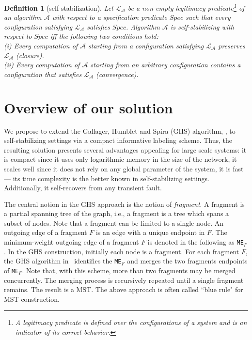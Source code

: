\documentclass[11pt,a4paper]{article}
\newtheorem{definition}{Definition}
\newcommand{\MF}{\mbox{\tt ME}}
\begin{document}
\begin{definition}[self-stabilization]
Let $\mathcal{L_{A}}$ be a non-empty \emph{legitimacy predicate}\footnote{A legitimacy predicate is defined over the configurations of a system and is an indicator of its correct behavior.} of an algorithm $\mathcal{A}$ with respect to a specification predicate $Spec$ such that every configuration satisfying $\mathcal{L_{A}}$ satisfies $Spec$. Algorithm $\mathcal{A}$ is \emph{self-stabilizing} with respect to $Spec$ iff the following two conditions hold:\\
\textsf{(i)} Every computation of $\mathcal{A}$ starting from a configuration satisfying $\mathcal{L_A}$ preserves $\mathcal{L_A}$ (\emph{closure}).  \\
\textsf{(ii)} Every computation of $\mathcal{A}$ starting from an arbitrary configuration contains a configuration that satisfies $\mathcal{L_A}$ (\emph{convergence}).
\end{definition}

\section{Overview of our solution}
We propose to extend the Gallager, Humblet and Spira (GHS) algorithm, 
\cite{GallagerHS83}, 
to self-stabilizing settings via a compact informative labeling scheme.
Thus, the resulting solution presents several advantages 
appealing for large scale systems: it is compact since it 
uses only logarithmic memory in the size of the network, 
it scales well since it does not rely on any global 
parameter of the system, it is fast --- its time complexity is the 
better known in self-stabilizing settings. Additionally, it self-recovers 
from any transient fault.


The central notion in the GHS approach is the notion of \textit{fragment}.
A fragment is a partial spanning tree of the graph, i.e., a fragment is a tree which spans a subset of nodes.
Note that a fragment can be limited to a single node.
An outgoing edge of a fragment $F$ is an edge with a unique endpoint in $F$.
The minimum-weight outgoing edge of a fragment $F$ is denoted in the following as \MF$_F$.
In the GHS construction, initially each node is a fragment.
For each fragment $F$, the GHS algorithm in~\cite{GallagerHS83} identifies 
the \MF$_F$ and merges the two fragments endpoints of \MF$_F$. 
Note that, with this scheme, more than two fragments may be merged concurrently. The merging process is recursively repeated until a single 
fragment remains. The result is a MST. The above approach is often 
called ``blue rule" for MST construction.
\end{document}
